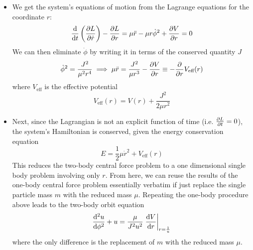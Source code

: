 \documentclass[11pt, a4paper]{article}
\newcommand{\veff}{V_{\text{eff}}}
\begin{document}
\begin{itemize}
	\item We get the system's equations of motion from the Lagrange equations for the coordinate $ r $:
	\begin{equation*}
		\dv{}{t}\left(\pdv{L}{\dot{r}}\right) - \pdv{L}{r} = \mu \ddot{r} - \mu r \dot{\phi}^{2} + \pdv{V}{r} = 0
	\end{equation*}
	We can then eliminate $ \dot{\phi} $ by writing it in terms of the conserved quantity $ J $
	\begin{equation*}
		\dot{\phi}^{2} = \frac{J^{2}}{\mu^{2} r^{4}} \implies \mu \ddot{r} = \frac{J^{2}}{\mu r^{3}} -\pdv{V}{r} \equiv - \pdv{}{r} \veff(r)
	\end{equation*}
	where $ \veff $ is the effective potential
	\begin{equation*}
		\veff(r) = V(r) + \frac{J^{2}}{2\mu r^{2}}
	\end{equation*}
	
	\item Next, since the Lagrangian is not an explicit function of time (i.e. $ \pdv{L}{t} = 0 $), the system's Hamiltonian is conserved, given the energy conservation equation
	\begin{equation*}
		E = \frac{1}{2}\mu \dot{r}^{2} + \veff(r)
	\end{equation*}
	This reduces the two-body central force problem to a one dimensional single body problem involving only $ r $. From here, we can reuse the results of the one-body central force problem essentially verbatim if just replace the single particle mass $ m $ with the reduced mass $ \mu $. Repeating the one-body procedure above leads to the two-body orbit equation
	\begin{equation*}
		\dv[2]{u}{\phi} + u = \frac{\mu}{J^{2}u^{2}} \eval{\dv{V}{r}}_{r = \frac{1}{u}}
	\end{equation*}
	where the only difference is the replacement of $ m $ with the reduced mass $ \mu $.
	
\end{itemize}
\end{document}
